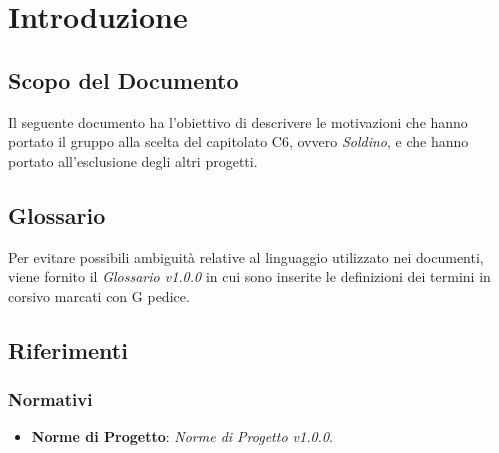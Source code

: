 \section{Introduzione}
\subsection{Scopo del Documento}
	Il seguente documento ha l'obiettivo di descrivere le motivazioni che hanno portato il gruppo alla scelta del capitolato C6, ovvero \textit{Soldino}, e che hanno portato all'esclusione degli altri progetti.
	
\subsection{Glossario}
	Per evitare possibili ambiguità relative al linguaggio utilizzato nei documenti, viene fornito il \textit{Glossario v1.0.0} in cui sono inserite le definizioni dei termini in corsivo marcati con G pedice.
	
\subsection{Riferimenti}
\subsubsection{Normativi}
\begin{itemize}
	\item \textbf{Norme di Progetto}: \textit{Norme di Progetto v1.0.0}.
\end{itemize}
	
